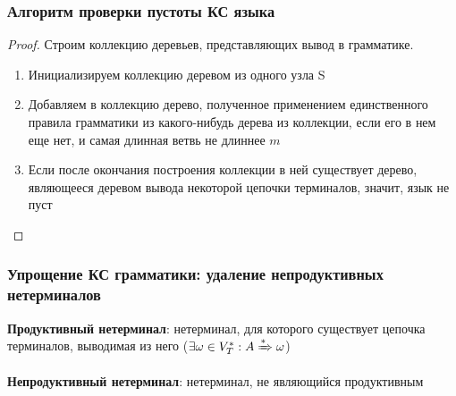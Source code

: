 \documentclass{beamer}
\newcommand{\derives}[1][*]{\xRightarrow[]{#1}}
\begin{document}
\begin{frame}[fragile]
\begin{columns}[T]
\begin{column}{0.45\textwidth}
\begin{center}
    \end{center}
  \end{column}
\end{columns}
\end{frame}

\begin{frame}[fragile]
  \transwipe[direction=90]
  \frametitle{Алгоритм проверки пустоты КС языка}
   \begin{proof}
   Строим коллекцию деревьев, представляющих вывод в грамматике.
   
  \begin{enumerate}
    \item Инициализируем коллекцию деревом из одного узла S
    \item Добавляем в коллекцию дерево, полученное применением единственного правила грамматики из какого-нибудь дерева из коллекции, если его в нем еще нет, и самая длинная ветвь не длиннее $m$
    \item Если после окончания построения коллекции в ней существует дерево, являющееся деревом вывода некоторой цепочки терминалов, значит, язык не пуст
  \end{enumerate}
   \end{proof}
\end{frame}

\begin{frame}[fragile]
  \transwipe[direction=90]
  \frametitle{Упрощение КС грамматики: удаление непродуктивных нетерминалов}
  \textbf{Продуктивный нетерминал}:  нетерминал, для которого существует цепочка терминалов, выводимая из него ($\exists \omega \in V_T^*: A \derives \omega$)

\vfill

  \textbf{Непродуктивный нетерминал}:  нетерминал, не являющийся продуктивным
\end{frame}
\end{document}
